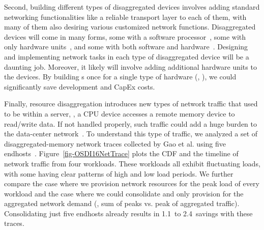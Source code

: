 Second, building different types of disaggregated devices involves adding standard networking functionalities like a reliable transport layer to each of them, with many of them also desiring various customized network functions.
Disaggregated devices will come in many forms, some with a software processor~\cite{LegoOS}, some with only hardware units~\cite{ATC20-pDPM}, and some with both software and hardware~\cite{clio-arxiv}. Designing and implementing network tasks in each type of disaggregated device will be a daunting job. Moreover, it likely will involve adding additional hardware units to the devices.
By building \nt{}s once for a single type of hardware (\ie, \snic), we could significantly save development and CapEx costs.
%

Finally, resource disaggregation introduces new types of network traffic that used to be within a server, \eg, a CPU device accesses a remote memory device to read/write data. 
If not handled properly, such traffic could add a huge burden to the data-center network~\cite{sirius-sigcomm20}.
To understand this type of traffic, we analyzed a set of disaggregated-memory network traces collected by Gao et al. using five endhosts~\cite{Gao16-OSDI}.
Figure~\ref{fig-OSDI16NetTrace} plots the CDF and the timeline of network traffic from four workloads.
These workloads all exhibit fluctuating loads, with some having clear patterns of high and low load periods.
We further compare the case where we provision network resources for the peak load of every workload and the case where we could consolidate and only provision for the aggregated network demand (\ie, sum of peaks vs. peak of aggregated traffic).
Consolidating just five endhosts already results in 1.1\x\ to 2.4\x\ savings with these traces.

